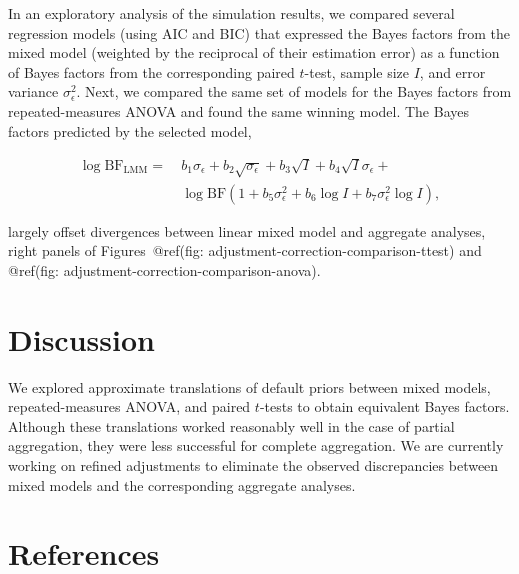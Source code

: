 \documentclass[
  man,floatsintext,draftall]{apa6}
\begin{document}
In an exploratory analysis of the simulation results, we compared several regression models (using AIC and BIC) that expressed the Bayes factors from the mixed model (weighted by the reciprocal of their estimation error) as a function of Bayes factors from the corresponding paired \(t\)-test, sample size \(I\), and error variance \(\sigma_\epsilon^2\).
Next, we compared the same set of models for the Bayes factors from repeated-measures ANOVA and found the same winning model.
The Bayes factors predicted by the selected model,

\[
\begin{aligned}
\log\mathrm{BF_{LMM}} = & ~ b_1 \sigma_\epsilon + b_2 \sqrt{\sigma_\epsilon} + b_3 \sqrt{I} + b_4 \sqrt{I} \sigma_\epsilon +\\
    & ~\log \mathrm{BF} (1 + b_5 \sigma_\epsilon^2 + b_6 \log I + b_7 \sigma_\epsilon^2 \log I),
\end{aligned}
\]

largely offset divergences between linear mixed model and aggregate analyses, right panels of Figures~@ref(fig: adjustment-correction-comparison-ttest) and @ref(fig: adjustment-correction-comparison-anova).

\hypertarget{discussion}{%
\section{Discussion}\label{discussion}}

We explored approximate translations of default priors between mixed models, repeated-measures ANOVA, and paired \(t\)-tests to obtain equivalent Bayes factors.
Although these translations worked reasonably well in the case of partial aggregation, they were less successful for complete aggregation.
We are currently working on refined adjustments to eliminate the observed discrepancies between mixed models and the corresponding aggregate analyses.

\newpage

\hypertarget{references}{%
\section{References}\label{references}}
\end{document}
